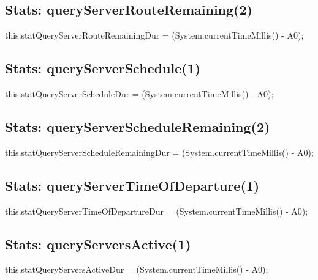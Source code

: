 \subsection{Stats: queryServerRouteRemaining(2)}
\nwenddocs{}\endmoddef{}
this.statQueryServerRouteRemainingDur = (System.currentTimeMillis() - A0);
\nwendcode{}\nwdocspar

\subsection{Stats: queryServerSchedule(1)}
\nwenddocs{}\endmoddef{}
this.statQueryServerScheduleDur = (System.currentTimeMillis() - A0);
\nwendcode{}\nwdocspar

\subsection{Stats: queryServerScheduleRemaining(2)}
\nwenddocs{}\endmoddef{}
this.statQueryServerScheduleRemainingDur = (System.currentTimeMillis() - A0);
\nwendcode{}\nwdocspar

\subsection{Stats: queryServerTimeOfDeparture(1)}
\nwenddocs{}\endmoddef{}
this.statQueryServerTimeOfDepartureDur = (System.currentTimeMillis() - A0);
\nwendcode{}\nwdocspar

\subsection{Stats: queryServersActive(1)}
\nwenddocs{}\endmoddef{}
this.statQueryServersActiveDur = (System.currentTimeMillis() - A0);
\nwendcode{}\nwdocspar

